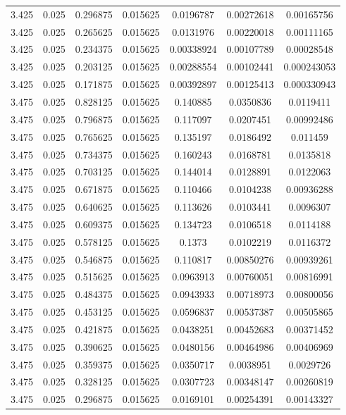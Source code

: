 \begin{flushleft}
\begin{longtable}{ccccccc}
3.425 & 0.025 & 0.296875 & 0.015625 & 0.0196787 & 0.00272618 & 0.00165756  \\ 
3.425 & 0.025 & 0.265625 & 0.015625 & 0.0131976 & 0.00220018 & 0.00111165  \\ 
3.425 & 0.025 & 0.234375 & 0.015625 & 0.00338924 & 0.00107789 & 0.00028548  \\ 
3.425 & 0.025 & 0.203125 & 0.015625 & 0.00288554 & 0.00102441 & 0.000243053  \\ 
3.425 & 0.025 & 0.171875 & 0.015625 & 0.00392897 & 0.00125413 & 0.000330943  \\ 
3.475 & 0.025 & 0.828125 & 0.015625 & 0.140885 & 0.0350836 & 0.0119411  \\ 
3.475 & 0.025 & 0.796875 & 0.015625 & 0.117097 & 0.0207451 & 0.00992486  \\ 
3.475 & 0.025 & 0.765625 & 0.015625 & 0.135197 & 0.0186492 & 0.011459  \\ 
3.475 & 0.025 & 0.734375 & 0.015625 & 0.160243 & 0.0168781 & 0.0135818  \\ 
3.475 & 0.025 & 0.703125 & 0.015625 & 0.144014 & 0.0128891 & 0.0122063  \\ 
3.475 & 0.025 & 0.671875 & 0.015625 & 0.110466 & 0.0104238 & 0.00936288  \\ 
3.475 & 0.025 & 0.640625 & 0.015625 & 0.113626 & 0.0103441 & 0.0096307  \\ 
3.475 & 0.025 & 0.609375 & 0.015625 & 0.134723 & 0.0106518 & 0.0114188  \\ 
3.475 & 0.025 & 0.578125 & 0.015625 & 0.1373 & 0.0102219 & 0.0116372  \\ 
3.475 & 0.025 & 0.546875 & 0.015625 & 0.110817 & 0.00850276 & 0.00939261  \\ 
3.475 & 0.025 & 0.515625 & 0.015625 & 0.0963913 & 0.00760051 & 0.00816991  \\ 
3.475 & 0.025 & 0.484375 & 0.015625 & 0.0943933 & 0.00718973 & 0.00800056  \\ 
3.475 & 0.025 & 0.453125 & 0.015625 & 0.0596837 & 0.00537387 & 0.00505865  \\ 
3.475 & 0.025 & 0.421875 & 0.015625 & 0.0438251 & 0.00452683 & 0.00371452  \\ 
3.475 & 0.025 & 0.390625 & 0.015625 & 0.0480156 & 0.00464986 & 0.00406969  \\ 
3.475 & 0.025 & 0.359375 & 0.015625 & 0.0350717 & 0.0038951 & 0.0029726  \\ 
3.475 & 0.025 & 0.328125 & 0.015625 & 0.0307723 & 0.00348147 & 0.00260819  \\ 
3.475 & 0.025 & 0.296875 & 0.015625 & 0.0169101 & 0.00254391 & 0.00143327  \\ 

\end{longtable}
\end{flushleft}
